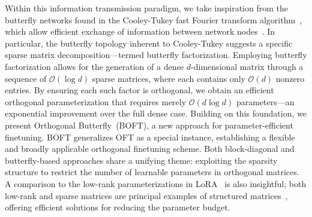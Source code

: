 Within this information transmission paradigm, we take inspiration from the butterfly networks found in the Cooley-Tukey fast Fourier transform algorithm~\cite{cooley1965algorithm}, which allow efficient exchange of information between network nodes~\cite{klasing1994broadcasting}. In particular, the butterfly topology inherent to Cooley-Tukey suggests a specific sparse matrix decomposition—termed butterfly factorization. Employing butterfly factorization allows for the generation of a dense $d$-dimensional matrix through a sequence of $\mathcal{O}(\log d)$ sparse matrices, where each contains only $\mathcal{O}(d)$ nonzero entries. By ensuring each such factor is orthogonal, we obtain an efficient orthogonal parameterization that requires merely $\mathcal{O}(d\log d)$ parameters—an exponential improvement over the full dense case. Building on this foundation, we present Orthogonal Butterfly~(BOFT), a new approach for parameter-efficient finetuning. BOFT generalizes OFT as a special instance, establishing a flexible and broadly applicable orthogonal finetuning scheme. Both block-diagonal and butterfly-based approaches share a unifying theme: exploiting the sparsity structure to restrict the number of learnable parameters in orthogonal matrices. A comparison to the low-rank parameterizations in LoRA~\cite{hulora2022} is also insightful; both low-rank and sparse matrices are principal examples of structured matrices~\cite{candes2011robust}, offering efficient solutions for reducing the parameter budget.

